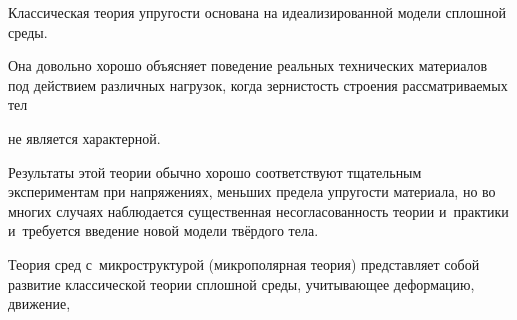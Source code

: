 
















\date{20/XII/2010} %









\maketitle






Классическая теория упругости основана на идеализированной модели сплошной среды. 

Она довольно хорошо объясняет поведение реальных технических материалов под действием различных нагрузок, когда зернистость строения рассматриваемых тел

не является характерной. 

Результаты этой теории обычно хорошо соответствуют тщательным экспериментам при напряжениях, меньших предела упругости материала, но во многих случаях наблюдается существенная несогласованность теории и~практики и~требуется введение новой модели твёрдого тела. 

Теория сред с~микроструктурой (микрополярная теория) представляет собой развитие классической теории сплошной среды, учитывающее деформацию, движение,

